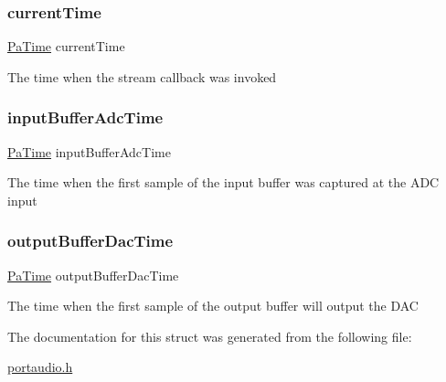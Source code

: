 \subsubsection{\texorpdfstring{current\+Time}{currentTime}}
{\footnotesize\ttfamily \hyperlink{portaudio_8h_af17a7e6d0471a23071acf8dbd7bbe4bd}{Pa\+Time} current\+Time}

The time when the stream callback was invoked \mbox{\label{struct_pa_stream_callback_time_info_a747ae151e0fbd441174e7bc883798b32}} 
\subsubsection{\texorpdfstring{input\+Buffer\+Adc\+Time}{inputBufferAdcTime}}
{\footnotesize\ttfamily \hyperlink{portaudio_8h_af17a7e6d0471a23071acf8dbd7bbe4bd}{Pa\+Time} input\+Buffer\+Adc\+Time}

The time when the first sample of the input buffer was captured at the A\+DC input \mbox{\label{struct_pa_stream_callback_time_info_a476879b92afeab8bfb02f508607a8109}} 
\subsubsection{\texorpdfstring{output\+Buffer\+Dac\+Time}{outputBufferDacTime}}
{\footnotesize\ttfamily \hyperlink{portaudio_8h_af17a7e6d0471a23071acf8dbd7bbe4bd}{Pa\+Time} output\+Buffer\+Dac\+Time}

The time when the first sample of the output buffer will output the D\+AC 

The documentation for this struct was generated from the following file\+:\begin{DoxyCompactItemize}
\item 
\hyperlink{portaudio_8h}{portaudio.\+h}\end{DoxyCompactItemize}
